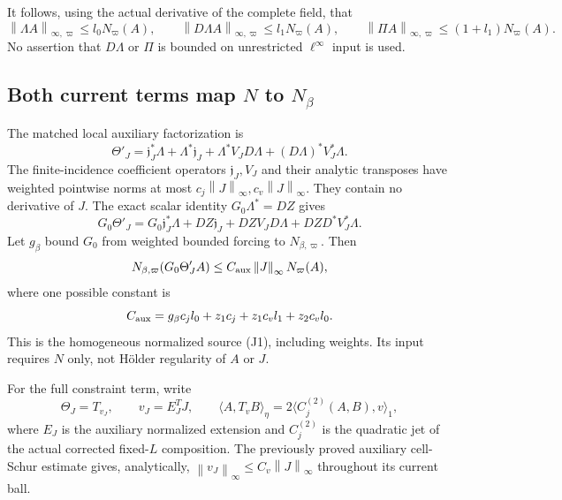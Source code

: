 \documentclass[11pt]{article}
\theoremstyle{remark}
\newcommand{\norm}[1]{\left\|#1\right\|}
\begin{document}
It follows, using the actual derivative of the complete field, that
\begin{equation}\label{pc-lambda-on-N}
 \norm{\Lambda A}_{\infty,\varpi}\le l_0N_\varpi(A),\qquad
 \norm{D\Lambda A}_{\infty,\varpi}\le l_1N_\varpi(A),\qquad
 \norm{\Pi A}_{\infty,\varpi}\le(1+l_1)N_\varpi(A).
\end{equation}
No assertion that $D\Lambda$ or $\Pi$ is bounded on unrestricted
$\ell^\infty$ input is used.

\subsection{Both current terms map $N$ to $N_\beta$}

The matched local auxiliary factorization is
\begin{equation}\label{pc-aux-factorization}
 \Theta'_J=\mathfrak j_J^*\Lambda+\Lambda^*\mathfrak j_J
       +\Lambda^*V_JD\Lambda+(D\Lambda)^*V_J^*\Lambda.
\end{equation}
The finite-incidence coefficient operators $\mathfrak j_J,V_J$
and their analytic transposes have weighted pointwise norms at most
$c_j\norm{J}_\infty,c_v\norm{J}_\infty$. They contain no derivative
of $J$. The exact scalar identity $G_0\Lambda^*=DZ$ gives
\begin{equation}\label{pc-outer-aux-smoothing}
 G_0\Theta'_J
  =G_0\mathfrak j_J^*\Lambda+DZ\mathfrak j_J
       +DZV_JD\Lambda+DZD^*V_J^*\Lambda.
\end{equation}
Let $g_\beta$ bound $G_0$ from weighted bounded forcing to
$N_{\beta,\varpi}$. Then
\begin{equation}\label{pc-aux-N-bound}
 N_{\beta,\varpi}(G_0\Theta'_JA)
        \le C_{\rm aux}\norm{J}_\infty N_\varpi(A),
\end{equation}
where one possible constant is
\[
 C_{\rm aux}=g_\beta c_jl_0+z_1c_j+z_1c_vl_1+z_2c_vl_0.
\]
This is the homogeneous normalized source (J1), including weights.
Its input requires $N$ only, not H\"older regularity of $A$ or $J$.

For the full constraint term, write
\begin{equation}\label{pc-constraint-weight}
 \Theta_J=T_{v_J},\qquad v_J=E_J^T J,
 \qquad
 \langle A,T_vB\rangle_\eta
      =2\langle C_j^{(2)}(A,B),v\rangle_1,
\end{equation}
where $E_J$ is the auxiliary normalized extension and $C_j^{(2)}$
is the quadratic jet of the actual corrected fixed-$L$ composition.
The previously proved auxiliary cell-Schur estimate gives, analytically,
$\norm{v_J}_\infty\le C_v\norm{J}_\infty$ throughout its current ball.
\end{document}
